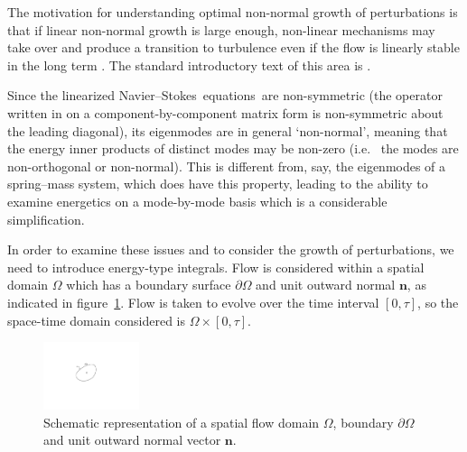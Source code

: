 \documentclass[11pt,a4paper]{report}
\newcommand\NavSto{Navier--Stokes}
\newcommand\LNS{linearized \NavSto}
\newcommand\LNSE{\LNS\ equations}
\newcommand{\ie}{i.e.\ }
\begin{document}
The motivation for understanding optimal non-normal growth of
perturbations is that if linear non-normal growth is large enough,
non-linear mechanisms may take over and produce a transition to
turbulence even if the flow is linearly stable in the long term
\citep[see e.g.][]{srk02}.
%
The standard introductory text of this area is \citet{schmid01}.

Since the \LNSE\ are non-symmetric (the operator written in on a
comp\-on\-ent-by-component matrix form is non-symmetric about the
leading diagonal), its eigenmodes are in general `non-normal', meaning
that the energy inner products of distinct modes may be non-zero (\ie
the modes are non-orthogonal or non-normal).  This is different from,
say, the eigenmodes of a spring--mass system, which does have this
property, leading to the ability to examine energetics on a
mode-by-mode basis which is a considerable simplification.  

In order to examine these issues and to consider the growth of
perturbations, we need to introduce energy-type integrals.
%
Flow is considered within a spatial domain $\Omega$ which has a
boundary surface $\partial\Omega$ and unit outward normal $\bm{n}$, as
indicated in figure~\ref{fig.domain}.  Flow is taken to evolve over
the time interval $[0,\tau]$, so the space-time domain considered is
$\Omega\times[0,\tau]$.

\begin{figure}
\begin{center}
\includegraphics[width=0.25\textwidth]{generaldomain}
\end{center}
\caption{Schematic representation of a spatial flow domain $\Omega$,
  boundary $\partial\Omega$ and unit outward normal vector $\bm{n}$.}
\label{fig.domain}
\end{figure}
\end{document}
